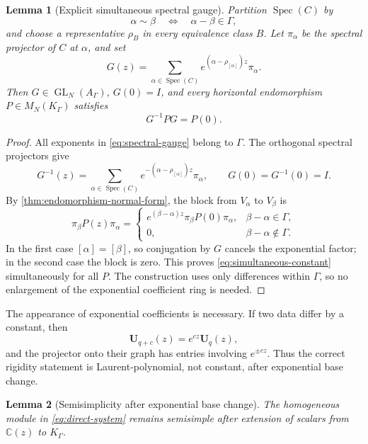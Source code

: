 \documentclass[11pt]{article}
\numberwithin{equation}{section}
\newtheorem{lemma}[lemma]{Lemma}
\theoremstyle{definition}
\theoremstyle{remark}
\newcommand{\C}{\mathbb C}
\newcommand{\Spec}{\operatorname{Spec}}
\begin{document}
\begin{lemma}[Explicit simultaneous spectral gauge]
\label{lem:spectral-gauge}
Partition $\Spec(C)$ by
\[
  \alpha\sim\beta\quad\Longleftrightarrow\quad\alpha-\beta\in\Gamma,
\]
and choose a representative $\rho_B$ in every equivalence class $B$.
Let $\pi_\alpha$ be the spectral projector of $C$ at $\alpha$, and set
\begin{equation}\label{eq:spectral-gauge}
  G(z)=\sum_{\alpha\in\Spec(C)}
       e^{(\alpha-\rho_{[\alpha]})z}\pi_\alpha.
\end{equation}
Then $G\in\operatorname{GL}_N(A_\Gamma)$, $G(0)=I$, and every horizontal
endomorphism $P\in M_N(K_\Gamma)$ satisfies
\begin{equation}\label{eq:simultaneous-constant}
  G^{-1}PG=P(0).
\end{equation}
\end{lemma}

\begin{proof}
All exponents in \eqref{eq:spectral-gauge} belong to $\Gamma$.  The
orthogonal spectral projectors give
\[
  G^{-1}(z)=\sum_{\alpha\in\Spec(C)}
           e^{-(\alpha-\rho_{[\alpha]})z}\pi_\alpha,
  \qquad G(0)=G^{-1}(0)=I.
\]
By \cref{thm:endomorphism-normal-form}, the block from $V_\alpha$ to
$V_\beta$ is
\[
  \pi_\beta P(z)\pi_\alpha
  =\begin{cases}
     e^{(\beta-\alpha)z}\pi_\beta P(0)\pi_\alpha,
       &\beta-\alpha\in\Gamma,\\
     0,&\beta-\alpha\notin\Gamma.
   \end{cases}
\]
In the first case $[\alpha]=[\beta]$, so conjugation by $G$ cancels the
exponential factor; in the second case the block is zero.  This proves
\eqref{eq:simultaneous-constant} simultaneously for all $P$.  The
construction uses only differences within $\Gamma$, so no enlargement of
the exponential coefficient ring is needed.
\end{proof}

The appearance of exponential coefficients is necessary.  If two data differ
by a constant, then
\[
  \mathbf U_{q+c}(z)=e^{cz}\mathbf U_q(z),
\]
and the projector onto their graph has entries involving $e^{\pm cz}$.
Thus the correct rigidity statement is Laurent-polynomial, not constant,
after exponential base change.

\begin{lemma}[Semisimplicity after exponential base change]
\label{lem:base-change-semisimple}
The homogeneous module in \eqref{eq:direct-system} remains semisimple after
extension of scalars from $\C(z)$ to $K_\Gamma$.
\end{lemma}
\end{document}
